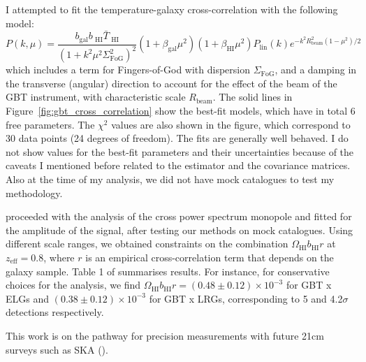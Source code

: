 I attempted to fit the temperature-galaxy cross-correlation with the following model:  
\begin{equation}
    P(k, \mu) = \frac{b_\text{gal}b_\text{ HI}\bar{T}_\text{ HI}}
                     {(1+k^2\mu^2\Sigma_\text{FoG}^2)^2}
                (1+\beta_\text{gal}\mu^2)(1+\beta_\text{HI}\mu^2)P_\text{lin}(k)e^{-k^2 R_\text{beam}^2(1-\mu^2)/2}
    \label{eq:model_hi_gal}
\end{equation}
which includes a term for Fingers-of-God with dispersion $\Sigma_\text{FoG}$,
and a damping in the transverse (angular) direction to account for the effect of the beam of the GBT instrument, with 
characteristic scale $R_\text{beam}$. 
The solid lines in Figure~\ref{fig:gbt_cross_correlation} show the best-fit models, which have in total 6 free parameters. 
The $\chi^2$ values are also shown in the figure, which correspond to 30 data points (24 degrees of freedom). 
The fits are generally well behaved. 
I do not show values for the best-fit parameters and their uncertainties because of the caveats I mentioned before
related to the estimator and the covariance matrices. 
Also at the time of my analysis, we did not have mock catalogues to test my methodology.  

\cite{wolzConstraintsCrosscorrelationEBOSS2022} proceeded with the analysis of the cross power spectrum monopole
and fitted for the amplitude of the signal, after testing our methods on mock catalogues. 
Using different scale ranges, we obtained constraints on the combination $\Omega_\text{HI}b_\text{HI}r$ at $z_\text{eff}=0.8$,
where $r$ is an empirical cross-correlation term that depends on the galaxy sample. 
Table 1 of \cite{wolzConstraintsCrosscorrelationEBOSS2022} summarises results. 
For instance, for conservative choices for the analysis, 
we find $\Omega_\text{HI}b_\text{HI}r = (0.48\pm0.12)\times 10^{-3}$ for GBT x ELGs 
and $(0.38\pm0.12)\times 10^{-3}$ for GBT x LRGs, corresponding to 5 and 4.2$\sigma$ detections respectively. 

This work is on the pathway for precision measurements with future 21cm surveys such as SKA 
(\cite{squarekilometrearraycosmologyscienceworkinggroupCosmologyPhaseSquare2020}).

